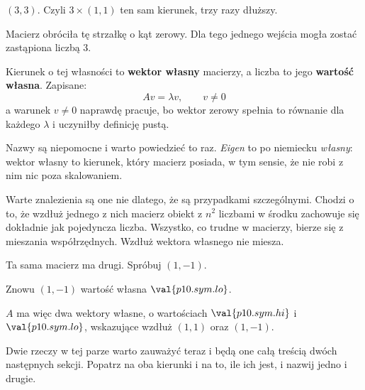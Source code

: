 \begin{fr}
\begin{ansblock}
$(3, 3)$. Czyli $3 \times (1, 1)$ \dash{} ten sam kierunek, trzy razy dłuższy.
\end{ansblock}

Macierz obróciła tę strzałkę o kąt zerowy. Dla tego jednego wejścia mogła
zostać zastąpiona liczbą $3$.

Kierunek o tej własności to \textbf{wektor własny} macierzy, a liczba to jego
\textbf{wartość własna}. Zapisane:
\[ Av = \lambda v, \qquad v \ne 0 \]
a warunek $v \ne 0$ naprawdę pracuje, bo wektor zerowy spełnia to równanie dla
każdego $\lambda$ i uczyniłby definicję pustą.
\end{fr}

\begin{fr}
Nazwy są niepomocne i warto powiedzieć to raz. \emph{Eigen} to po niemiecku
\emph{własny}: wektor własny to kierunek, który macierz posiada, w tym sensie,
że nie robi z nim nic poza skalowaniem.

Warte znalezienia są one nie dlatego, że są przypadkami szczególnymi. Chodzi o
to, że wzdłuż jednego z nich macierz \dash{} obiekt z $n^{2}$ liczbami w środku
\dash{} zachowuje się dokładnie jak pojedyncza liczba. Wszystko, co trudne w
macierzy, bierze się z mieszania współrzędnych. Wzdłuż wektora własnego nie
miesza.
\end{fr}


\begin{fr}
Ta sama macierz ma drugi. Spróbuj $(1, -1)$.
\dotline
\nextframe
\end{fr}

\begin{fr}
\begin{ansblock}
Znowu $(1, -1)$ \dash{} wartość własna $\val{p10.sym.lo}$.
\end{ansblock}

$A$ ma więc dwa wektory własne, o wartościach $\val{p10.sym.hi}$ i
$\val{p10.sym.lo}$, wskazujące wzdłuż $(1,1)$ oraz $(1,-1)$.

Dwie rzeczy w tej parze warto zauważyć teraz i będą one całą treścią dwóch
następnych sekcji. Popatrz na oba kierunki i na to, ile ich jest, i nazwij
jedno i drugie.
\dotline
\nextframe
\end{fr}

